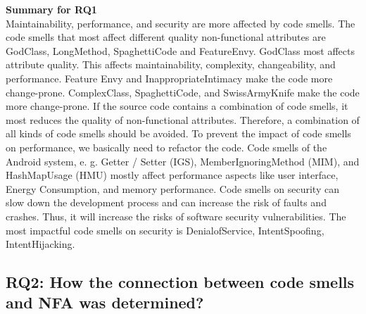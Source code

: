 \documentclass{sigchi}
\begin{document}
\textbf{Summary for RQ1}\\
Maintainability, performance, and security are more affected by code smells. The code smells that most affect different quality non-functional attributes are GodClass, LongMethod, SpaghettiCode and FeatureEnvy. GodClass most affects attribute quality. This affects maintainability, complexity, changeability, and performance. Feature Envy and InappropriateIntimacy make the code more change-prone. ComplexClass, SpaghettiCode, and SwissArmyKnife make the code more change-prone. If the source code contains a combination of code smells, it most reduces the quality of non-functional attributes. Therefore, a combination of all kinds of code smells should be avoided. To prevent the impact of code smells on performance, we basically need to refactor the code. Code smells of the Android system, e. g. Getter / Setter (IGS), MemberIgnoringMethod (MIM), and HashMapUsage (HMU) mostly affect performance aspects like user interface, Energy Consumption, and memory performance. Code smells on security can slow down the development process and can increase the risk of faults and crashes. Thus, it will increase the risks of software security vulnerabilities. The most impactful code smells on security is DenialofService, IntentSpoofing, IntentHijacking.

\subsection{RQ2: How the connection between code smells and NFA was determined? }
\end{document}
